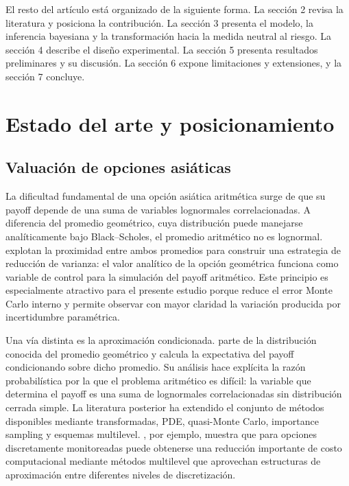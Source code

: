 \documentclass[12pt,letterpaper]{article}
\begin{document}
El resto del artículo está organizado de la siguiente forma. La sección 2 revisa la literatura y posiciona la contribución. La sección 3 presenta el modelo, la inferencia bayesiana y la transformación hacia la medida neutral al riesgo. La sección 4 describe el diseño experimental. La sección 5 presenta resultados preliminares y su discusión. La sección 6 expone limitaciones y extensiones, y la sección 7 concluye.

\section{Estado del arte y posicionamiento}

\subsection{Valuación de opciones asiáticas}

La dificultad fundamental de una opción asiática aritmética surge de que su payoff depende de una suma de variables lognormales correlacionadas. A diferencia del promedio geométrico, cuya distribución puede manejarse analíticamente bajo Black--Scholes, el promedio aritmético no es lognormal. \citet{kemnavorst1990} explotan la proximidad entre ambos promedios para construir una estrategia de reducción de varianza: el valor analítico de la opción geométrica funciona como variable de control para la simulación del payoff aritmético. Este principio es especialmente atractivo para el presente estudio porque reduce el error Monte Carlo interno y permite observar con mayor claridad la variación producida por incertidumbre paramétrica.

Una vía distinta es la aproximación condicionada. \citet{curran1994} parte de la distribución conocida del promedio geométrico y calcula la expectativa del payoff condicionando sobre dicho promedio. Su análisis hace explícita la razón probabilística por la que el problema aritmético es difícil: la variable que determina el payoff es una suma de lognormales correlacionadas sin distribución cerrada simple. La literatura posterior ha extendido el conjunto de métodos disponibles mediante transformadas, PDE, quasi-Monte Carlo, importance sampling y esquemas multilevel. \citet{kahale2020}, por ejemplo, muestra que para opciones discretamente monitoreadas puede obtenerse una reducción importante de costo computacional mediante métodos multilevel que aprovechan estructuras de aproximación entre diferentes niveles de discretización.
\end{document}
